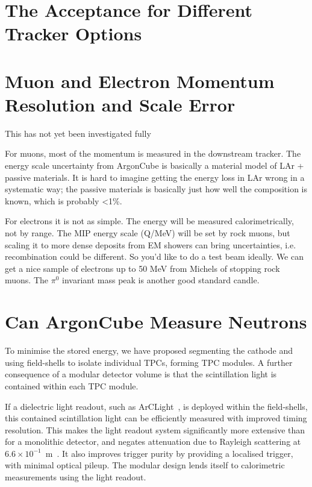 \documentclass[a4paper]{article}
\begin{document}
\section{The Acceptance for Different Tracker Options}



\section{Muon and Electron Momentum Resolution and Scale Error}



This has not yet been investigated fully 

For muons, most of the momentum is measured in the downstream tracker.  The energy scale uncertainty from ArgonCube is basically a material model of LAr + passive materials.  It is hard to imagine getting the energy loss in LAr wrong in a systematic way; the passive materials is basically just how well the composition is known, which is probably \textless 1\%.

For electrons it is not as simple. The energy will be measured calorimetrically, not by range.  The MIP energy scale (Q/MeV) will be set by rock muons, but scaling it to more dense deposits from EM showers can bring uncertainties, i.e. recombination could be different.  So you'd like to do a test beam ideally.  We can get a nice sample of electrons up to 50 MeV from Michels of stopping rock muons. The $\pi^0$ invariant mass peak is another good standard candle.

\section{Can ArgonCube Measure Neutrons}


To minimise the stored energy, we have proposed segmenting the cathode and using field-shells to isolate individual TPCs, forming TPC modules. 
A further consequence of a modular detector volume is that the scintillation light is contained within each TPC module. 

If a dielectric light readout, such as ArCLight~\cite{arclight}, is deployed within the field-shells, this contained scintillation light can be efficiently measured with improved timing resolution.  
This makes the light readout system significantly more extensive than for a monolithic detector, and negates attenuation due to Rayleigh scattering at $6.6\times10^{-1}$~m~\cite{Rayleigh}.
It also improves trigger purity by providing a localised trigger, with minimal optical pileup.
The modular design lends itself to calorimetric measurements using the light readout.  
\end{document}
